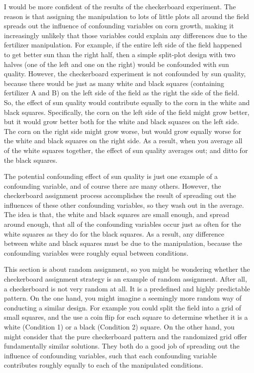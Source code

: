 I would be more confident of the results of the checkerboard experiment. The reason is that assigning the manipulation to lots of little plots all around the field spreads out the influence of confounding variables on corn growth, making it increasingly unlikely that those variables could explain any differences due to the fertilizer manipulation. For example, if the entire left side of the field happened to get better sun than the right half, then a simple split-plot design with two halves (one of the left and one on the right) would be confounded with sun quality. However, the checkerboard experiment is not confounded by sun quality, because there would be just as many white and black squares (containing fertilizer A and B) on the left side of the field as the right the side of the field. So, the effect of sun quality would contribute equally to the corn in the white and black squares. Specifically, the corn on the left side of the field might grow better, but it would grow better both for the white and black squares on the left side. The corn on the right side might grow worse, but would grow equally worse for the white and black squares on the right side. As a result, when you average all of the white squares together, the effect of sun quality averages out; and ditto for the black squares. 

The potential confounding effect of sun quality is just one example of a confounding variable, and of course there are many others. However, the checkerboard assignment process accomplishes the result of spreading out the influences of these other confounding variables, so they wash out in the average. The idea is that, the white and black squares are small enough, and spread around enough, that all of the confounding variables occur just as often for the white squares as they do for the black squares. As a result, any difference between white and black squares must be due to the manipulation, because the confounding variables were roughly equal between conditions.

This section is about random assignment, so you might be wondering whether the checkerboard assignment strategy is an example of random assignment. After all, a checkerboard is not very random at all. It is a predefined and highly predictable pattern. On the one hand, you might imagine a seemingly more random way of conducting a similar design. For example you could split the field into a grid of small squares, and the use a coin flip for each square to determine whether it is a white (Condition 1) or a black (Condition 2) square. On the other hand, you might consider that the pure checkerboard pattern and the randomized grid offer fundamentally similar solutions. They both do a good job of spreading out the influence of confounding variables, such that each confounding variable contributes roughly equally to each of the manipulated conditions.

